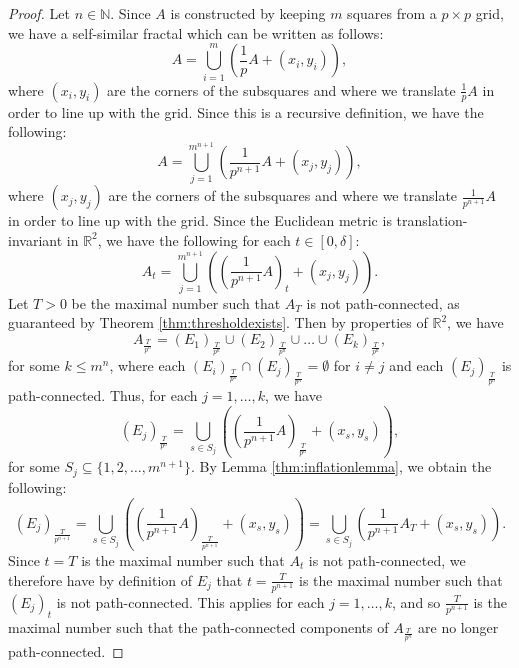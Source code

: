 \documentclass{article}
\theoremstyle{plain}
\numberwithin{equation}{section}
\numberwithin{table}{section}
\numberwithin{figure}{section}
\begin{document}
\begin{proof}
Let $n \in \mathbb{N}$. Since $A$ is constructed by keeping $m$ squares from a $p \times p$ grid, we have a self-similar fractal which can be written as follows:
\begin{equation}
A = \bigcup_{i=1}^m \left(\frac{1}{p} A + (x_i,y_i)\right),
\end{equation}
where $(x_i,y_i)$ are the corners of the subsquares and where we translate $\frac{1}{p} A$ in order to line up with the grid. Since this is a recursive definition, we have the following:
\begin{equation}
A = \bigcup_{j=1}^{m^{n+1}} \left(\frac{1}{p^{n+1}} A + (x_j,y_j)\right),
\end{equation}
where $(x_j,y_j)$ are the corners of the subsquares and where we translate $\frac{1}{p^{n+1}} A$ in order to line up with the grid. Since the Euclidean metric is translation-invariant in $\mathbb{R}^2$, we have the following for each $t \in [0,\delta]$:
\begin{equation} \label{eq:selfsimilardef}
A_t = \bigcup_{j=1}^{m^{n+1}} \left(\left(\frac{1}{p^{n+1}} A\right)_t + (x_j,y_j)\right).
\end{equation}
Let $T > 0$ be the maximal number such that $A_T$ is not path-connected, as guaranteed by Theorem \ref{thm:thresholdexists}. Then by properties of $\mathbb{R}^2$, we have 
\begin{equation}
A_{\frac{T}{p^n}} = (E_1)_{\frac{T}{p^n}} \cup (E_2)_{\frac{T}{p^n}} \cup\dots\cup (E_k)_{\frac{T}{p^n}},
\end{equation}
for some $k \leq m^n$, where each $(E_i)_{\frac{T}{p^n}} \cap (E_j)_{\frac{T}{p^n}} = \emptyset$ for $i \neq j$ and each $(E_j)_{\frac{T}{p^n}}$ is path-connected. Thus, for each $j = 1,\dots,k$, we have
\begin{equation}
(E_j)_{\frac{T}{p^n}} = \bigcup_{s \in S_j} \left(\left(\frac{1}{p^{n+1}} A\right)_{\frac{T}{p^n}} + (x_s,y_s)\right),
\end{equation}
for some $S_j \subseteq \{1,2,\dots,m^{n+1}\}$. By Lemma \ref{thm:inflationlemma}, we obtain the following:
\begin{equation}
(E_j)_{\frac{T}{p^{n+1}}} = \bigcup_{s \in S_j} \left(\left(\frac{1}{p^{n+1}} A\right)_{\frac{T}{p^{n+1}}} + (x_s,y_s)\right)
= \bigcup_{s \in S_j} \left(\frac{1}{p^{n+1}} A_T + (x_s,y_s)\right).
\end{equation}
Since $t = T$ is the maximal number such that $A_t$ is not path-connected, we therefore have by definition of $E_j$ that $t = \frac{T}{p^{n+1}}$ is the maximal number such that $(E_j)_t$ is not path-connected. This applies for each $j = 1,\dots,k$, and so $\frac{T}{p^{n+1}}$ is the maximal number such that the path-connected components of $A_{\frac{T}{p^n}}$ are no longer path-connected.
\end{proof}
\end{document}
